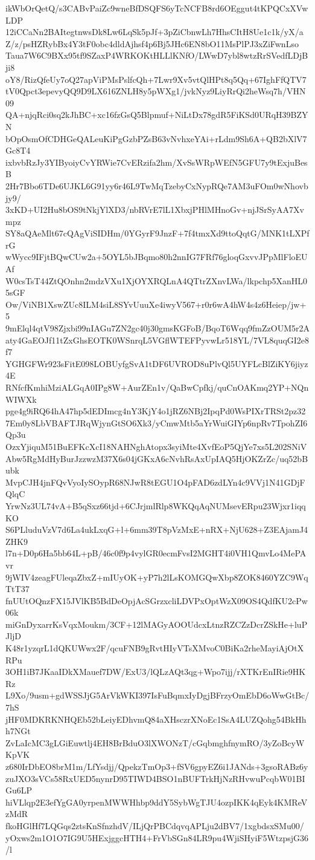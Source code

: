 ikWbOrQetQ/s3CABvPaiZc9wneBfDSQFS6yTcNCFB8rd6OEggut4tKPQCxXVwLDP
12iCCaNn2BAItegtnwsDk8Lw6LqSk5pJf+3pZiCbnwLh7HhsCItH8Ue1c1k/yX/a
Z/z/psHZRybBx4Y3tF0obc4dldAjhsf4p6Bj5JHc6EN8bO11MsPlPJ3xZiFwnLso
Taua7W6C9BXx95tf9SZaxP4WRKOKtHLLlKNfO/LWwD7ybl8wtzRrSVedfLDjBji8
oY8/RizQfeUy7oQ27apViPMsPslfcQh+7Lwr9Xv5vtQlHPt8q5Qq+67IghFfQTV7
tV0Qpct3epevyQQ9D9LX616ZNLH8y5pWXg1/jvkNyz9LiyRrQi2heWsq7h/VHN09
QA+njqRci0sq2kJhBC+xc16fzGsQ5Blpmuf+NiLtDx78gdR5FiKSd0URqH39BZYN
bOpOsmOfCDHGeQALeuKiPgGzbPZsB63vNvhxeYAi+rLdm9Sh6A+QB2bXlV7Gc8T4
ixbvbRzJy3YIByoiyCvYRWie7CvERzifa2hm/XvSsWRpWEfN5GFU7y9tExjuBesB
2Hr7Bbo6TDe6UJKL6G91yy6r46L9TwMqTzebyCxNypRQe7AM3uFOm0wNhovbjy9/
3xKD+UI2Hu8bOS9tNkjYlXD3/nbRVrE7lL1XbxjPHlMHnoGv+njJSrSyAA7Xvmpz
SY8aQAeMlt67cQAgViSIDHm/0YGyrF9JnzF+7f4tmxXd9ttoQqtG/MNK1tLXPfrG
wWycc9IFjtBQwCUw2a+5OYL5bJBqmo80h2nnIG7FRf76gloqGxvvJPpMlFloEUAf
W0csTsT44ZtQOnhn2mdzVXu1XjOYXRQLnA4QTtrZXnvLWa/lkpchp5XanHL05sGF
Ow/ViNB1XswZUc8ILM4siL8SYvUuuXe4iwyV567+r0r6wA4hW4s4z6Heiep/jw+5
9mElql4qtV98Zjxbi99nIAGu7ZN2gc40j30gmsKGFoB/BqoT6Wqq9fmZzOUM5r2A
aty4GaEOJf11tZxGhsEOTK0WSnrqL5VGflWTEFPyvwLr518YL/7VL8quqGI2e8f7
YGHGFWr923sFitE098LOBUyfgSvA1tDF6UVROD8uPlvQl5UYFLcBlZiKY6jiyz4E
RNfcfKmhiMziALGqA0IPg8W+AurZEn1v/QaBwCpfkj/quCnOAKmq2YP+NQnWIWXk
pge4g9iRQ64hA47hp5dEDImcg4nY3KjY4o1jRZ6NBj2IpqPd0WsPIXrTRSt2pz32
7Em0y8LbVBAFTJRqWjynGtSO6Xk3/yCmwMtb5aYrWuiGIYp6npRv7TpohZI6Qp3u
OzxYjiquM51BuEFKcXcI18NAHNghAtopx3syiMte4XvfEoP5QjYe7xs5L202SNiV
Abw5RgMdHyBurJzzwzM37X6s04jGKxA6cNvhRsAxUpIAQ5HjOKZrZc/uq52bBubk
MvpCJH4jnFQvVyoIySOypR68NJwR8tEGU1O4pFAD6zdLYn4c9VVj1N41GDjFQlqC
YrwNz3UL74vA+B5qSxz66tjd+6CJrjmlRlp8WKQqAqNUMsevERpu23Wjxr1iqqKO
S6PLluduVzV7d6La4ukLxqG+l+6mm39T8pVzMxE+nRX+NjU628+Z3EAjamJ4ZHK9
l7n+D0p6Ha5bb64L+pB/46c0f9p4vylGR0ecmFvsI2MGHT4i0VH1QmvLo4MePAvr
9jWIV4zeagFUleqaZbxZ+mIUyOK+yP7h2lLsKOMGQwXbp8ZOK8460YZC9WqTtT37
fnUUtOQnzFX15JVlKB5BdDeOpjAcSGrzxcliLDVPxOptWzX09OS4QdfKU2cPw06k
miGnDyxarrKsVqxMoukm/3CF+12lMAGyAOOUdcxLtnzRZCZzDcrZSkHe+luPJljD
K48r1yzqrL1dQKUWwx2F/qcuFNB9gRvtHIyVTsXMvoC0BiKa2rheMayiAjOtXRPu
3OH1iB7JKaaIDkXMauef7DW/ExU3/lQLzAQt3qg+Wpo7ijj/rXTKrEnIRie9HKRz
L9Xo/9usm+gdWSSJjG5ArVkWKI397IsFuBqmxIyDgjBFrzyOmEbD6oWwGtBc/7hS
jHF0MDKRKNHQEb52bLeiyEDhvmQ84aXHsczrXNoEc1SsA4LUZQohg54BkHhh7NGt
ZvLaIcMC3gLGiEuwtlj4EH8BrBduO3lXWONzT/cGqbmghfnymRO/3yZoBcyWKpVK
z680IrDbEO8brM1m/LfYsdjj/QpekzTmOp3+fSV6gpyEZ6i1JANds+3gsoRABz6y
zuJXO3sVCs58RxUED5nynrD95TIWD4BSO1nBUFTrkHjNzRHvwuPcqbW01BIGu6LP
hiVLlqp2E3efYgGA0yrpenMWWHhbp9ddY5SybWgTJU4ozpIKK4qEyk4KMReVzMdR
fkoHGlHf7LQGqs2ztsKnSfnzhdV/ILjQrPBCdqvqAPLju2dBV7/1xgbdsxSMu00/
yOxws2m1O1O7IG9U5HExjggcHTH4+FrVbSGn84LR9pu4WjiSHyiF5WtzpsjG36/l
